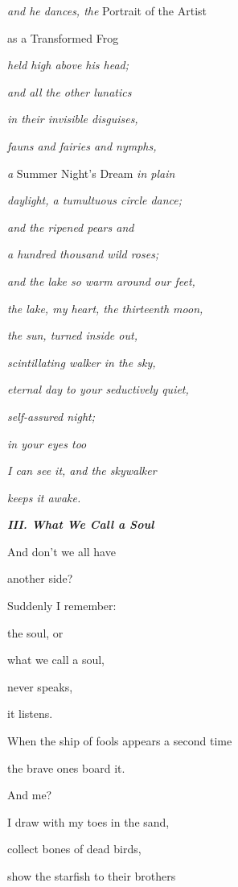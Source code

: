 \emph{and he dances, the }Portrait of the Artist

as a Transformed Frog

\emph{
held high above his head;}

\emph{
and all the other lunatics}

\emph{
in their invisible disguises,}

\emph{
fauns and fairies and nymphs,}

\emph{a }Summer Night's Dream \emph{in plain}

\emph{
daylight, a tumultuous circle dance;}

\emph{
and the ripened pears and}

\emph{
a hundred thousand wild roses;}

\emph{
and the lake so warm around our feet,}

\emph{
the lake, my heart, the thirteenth moon, }

\emph{
the sun, turned inside out,}

\emph{
scintillating walker in the sky, }

\emph{
eternal day to your seductively quiet,}

\emph{
self-assured night; }

\emph{
in your eyes too}

\emph{
I can see it, and the skywalker}

\emph{
keeps it awake.}


\bigskip

{\bfseries\itshape
III. What We Call a Soul}


\bigskip

And don't we all have

another side?


\bigskip

Suddenly I remember:

the soul, or

what we call a soul,

never speaks,

it listens.


\bigskip

When the ship of fools appears a second time

the brave ones board it.

And me? 


\bigskip

I draw with my toes in the sand,

collect bones of dead birds,

show the starfish to their brothers

